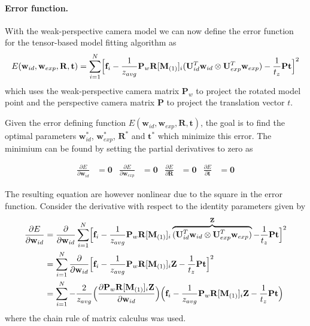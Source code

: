 \documentclass[11pt,a4paper]{report}
\begin{document}
\paragraph{Error function.} With the weak-perspective camera model we can now define the error function for
the tensor-based model fitting algorithm as
\begin{equation}\label{eq:fig10}
E(\mathbf{w}_{id}, \mathbf{w}_{exp}, \mathbf{R}, \mathbf{t}) = \sum_{i=1}^N \Bigl[\mathbf{f}_i - \frac{1}{z_{avg}}\mathbf{P}_w\mathbf{R}[\mathbf{M}_{(1)}]_{i}(\mathbf{U}_{id}^T\mathbf{w}_{id} \otimes
\mathbf{U}_{exp}^T\mathbf{w}_{exp}) - \frac{1}{t_z}\mathbf{P}\mathbf{t}\Bigr]^2
\end{equation}
which uses the weak-perspective camera matrix $\mathbf{P}_w$ to project the
rotated model point and the perspective camera matrix $\mathbf{P}$ to project
the translation vector $t$. 

Given the error defining function $E(\mathbf{w}_{id}, \mathbf{w}_{exp}, \mathbf{R},
\mathbf{t})$, the goal is to find the optimal parameters $\mathbf{w}_{id}^*$,
$\mathbf{w}_{exp}^*$, $\mathbf{R}^*$ and
$\mathbf{t}^*$ which minimize this
error. The minimium can be found by setting the partial derivatives to zero as

\begin{align}\label{eq:fig11}
\frac{\partial E}{\partial \mathbf{w}_{id}} &= \mathbf{0} & \frac{\partial
  E}{\partial \mathbf{w}_{exp}} &= \mathbf{0} & \frac{\partial E}{\partial
  \mathbf{R}} &= \mathbf{0} & \frac{\partial E}{\partial \mathbf{t}} &= \mathbf{0}
\end{align}

The resulting equation are however nonlinear due to the square in the error
function. Consider the derivative with respect to the identity parameters given by 
\begin{align*}\label{eq:fig12}
\frac{\partial E}{\partial \mathbf{w}_{id}} &= \frac{\partial}{\partial \mathbf{w}_{id}}\sum_{i=1}^N \Bigl[\mathbf{f}_i - \frac{1}{z_{avg}}\mathbf{P}_w\mathbf{R}[\mathbf{M}_{(1)}]_{i}\overbrace{(\mathbf{U}_{id}^T\mathbf{w}_{id} \otimes
\mathbf{U}_{exp}^T\mathbf{w}_{exp})}^{\mathbf{Z}} - \frac{1}{t_z}\mathbf{P}\mathbf{t}\Bigr]^2\\
&=\sum_{i=1}^N \frac{\partial}{\partial \mathbf{w}_{id}}\Bigl[\mathbf{f}_i - \frac{1}{z_{avg}}\mathbf{P}_w\mathbf{R}[\mathbf{M}_{(1)}]_{i}\mathbf{Z} -
\frac{1}{t_z}\mathbf{P}\mathbf{t}\Bigr]^2\\
&=\sum_{i=1}^N -\frac{2}{z_{avg}}\Bigl(\frac{\partial \mathbf{P}_w\mathbf{R}[\mathbf{M}_{(1)}]_{i}\mathbf{Z}}{\partial
  \mathbf{w}_{id}}\Bigr)\Bigl(\mathbf{f}_i -
\frac{1}{z_{avg}}\mathbf{P}_w\mathbf{R}[\mathbf{M}_{(1)}]_{i}\mathbf{Z} -
\frac{1}{t_z}\mathbf{P}\mathbf{t}\Bigr)
\end{align*}
where the chain rule of matrix calculus was used. 
\end{document}

